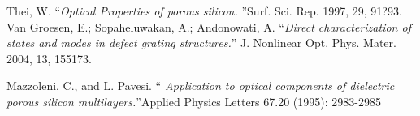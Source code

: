 \documentclass{article}
\begin{document}
\begin{thebibliography}{X}
 Thei, W. \textquotedblleft \emph{Optical Properties of porous silicon.}
\textquotedblright Surf. Sci. Rep. 1997, 29, 91?93.
 Van Groesen, E.; Sopaheluwakan, A.; Andonowati,
  A. \textquotedblleft  \emph{Direct characterization of states and
    modes in defect grating structures.}\textquotedblright
  J. Nonlinear Opt. Phys. Mater. 2004, 13, 155173.

 Mazzoleni, C., and L. Pavesi. \textquotedblleft
  \emph{Application to optical components of dielectric porous silicon
    multilayers.}\textquotedblright Applied Physics Letters 67.20
  (1995): 2983-2985

\end{thebibliography}
\end{document}
